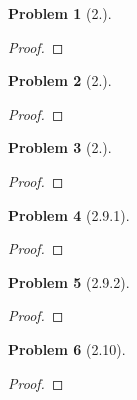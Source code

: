 \documentclass[10pt]{article}
\newcommand{\sk}{\vskip 10mm}
\theoremstyle{plain}
\newtheorem{problem}{Problem}
\theoremstyle{remark}
\begin{document}
\begin{problem}[2.]
  
\end{problem}

\begin{proof}
  
\end{proof}

\sk

\begin{problem}[2.]
  
\end{problem}

\begin{proof}
  
\end{proof}

\sk

\begin{problem}[2.]
  
\end{problem}

\begin{proof}
  
\end{proof}

\sk

\begin{problem}[2.9.1]
  
\end{problem}

\begin{proof}
  
\end{proof}

\sk

\begin{problem}[2.9.2]
  
\end{problem}

\begin{proof}
  
\end{proof}

\sk

\begin{problem}[2.10]
  
\end{problem}

\begin{proof}
  
\end{proof}

\end{document}
